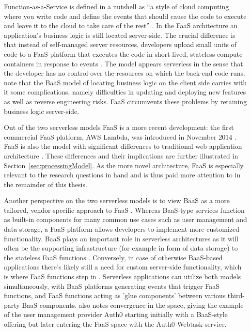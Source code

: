 Function-as-a-Service is defined in a nutshell as ``a style of cloud computing where you write code and define the events that should cause the code to execute and leave it to the cloud to take care of the rest'' \parencite{gannon17cloudNative}. In the FaaS architecture an application's business logic is still located server-side. The crucial difference is that instead of self-managed server resources, developers upload small units of code to a FaaS platform that executes the code in short-lived, stateless compute containers in response to events \parencite{robert2016serverlessarchitectures}. The model appears serverless in the sense that the developer has no control over the resources on which the back-end code runs. \textcite{albuquerque17faaspaas} note that the BaaS model of locating business logic on the client side carries with it some complications, namely difficulties in updating and deploying new features as well as reverse engineering risks. FaaS circumvents these problems by retaining business logic server-side.

Out of the two serverless models FaaS is a more recent development: the first commercial FaaS platform, AWS Lambda, was introduced in November 2014 \parencite{awslambda0218}.
FaaS is also the model with significant differences to traditional web application architecture \parencite{robert2016serverlessarchitectures}. These differences and their implications are further illustrated in Section~\ref{sec:processingModel}. As the more novel architecture, FaaS is especially relevant to the research questions in hand and is thus paid more attention to in the remainder of this thesis.

Another perspective on the two serverless models is to view BaaS as a more tailored, vendor-specific approach to FaaS \parencite{van2017spec}. Whereas BaaS-type services function as built-in components for many common use cases such as user management and data storage, a FaaS platform allows developers to implement more customized functionality. BaaS plays an important role in serverless architectures as it will often be the supporting infrastructure (for example in form of data storage) to the stateless FaaS functions \parencite{cncf18serverlessWG}. Conversely, in case of otherwise BaaS-based applications there's likely still a need for custom server-side functionality, which is where FaaS functions step in \parencite{robert2016serverlessarchitectures}. Serverless applications can utilize both models simultaneously, with BaaS platforms generating events that trigger FaaS functions, and FaaS functions acting as 'glue components' between various third-party BaaS components. \textcite{robert2016serverlessarchitectures} also notes convergence in the space, giving the example of the user management provider Auth0 starting initially with a BaaS-style offering but later entering the FaaS space with the Auth0 Webtask service.

